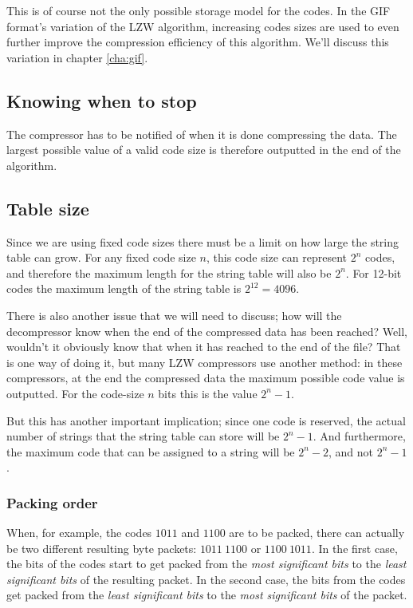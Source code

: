 This is of course not the only possible storage model for the
codes. In the GIF format's variation of the LZW algorithm, increasing
codes sizes are used to even further improve the compression
efficiency of this algorithm. We'll discuss this variation in chapter
\ref{cha:gif}.

\subsection{Knowing when to stop}

The compressor has to be notified of when it is done compressing the
data. The largest possible value of a valid code size is therefore
outputted in the end of the algorithm.

\subsection{Table size}

Since we are using fixed code sizes there must be a limit on how large
the string table can grow. For any fixed code size $n$, this code size
can represent $2^n$ codes, and therefore the maximum length for the
string table will also be $2^n$. For 12-bit codes the maximum length
of the string table is $2^{12}=4096$.

There is also another issue that we will need to discuss; how will the
decompressor know when the end of the compressed data has been
reached? Well, wouldn't it obviously know that when it has reached to
the end of the file? That is one way of doing it, but many LZW
compressors use another method: in these compressors, at the end the
compressed data the maximum possible code value is outputted. For the
code-size $n$ bits this is the value $2^n - 1$.

But this has another important implication; since one code is
reserved, the actual number of strings that the string table can store
will be $2^n - 1$. And furthermore, the maximum code that can be
assigned to a string will be $2^n - 2$, and not $2^n - 1$.

\subsubsection{Packing order}

When, for example, the codes $1011$ and $1100$ are to be packed, there
can actually be two different resulting byte packets: $1011\ 1100$ or
$1100\ 1011$. In the first case, the bits of the codes start to get
packed from the \textit{most significant bits} to the \textit{least
  significant bits} of the resulting packet. In the second case, the
bits from the codes get packed from the \textit{least significant
  bits} to the \textit{most significant bits} of the packet.


